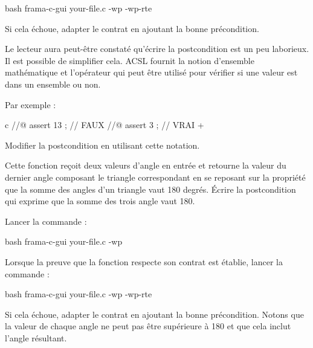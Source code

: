 \begin{CodeBlock}{bash}
frama-c-gui your-file.c -wp -wp-rte
\end{CodeBlock}


Si cela échoue, adapter le contrat en ajoutant la bonne précondition.


Le lecteur aura peut-être constaté qu'écrire la postcondition est un peu
laborieux. Il est possible de simplifier cela. ACSL fournit la notion
d'ensemble mathématique et l'opérateur  qui
peut être utilisé pour vérifier si une valeur est dans un ensemble ou non.


Par exemple :

\begin{CodeBlock}{c}
//@ assert 13  ; // FAUX
//@ assert 3   ; // VRAI
+\end{CodeBlock}


Modifier la postcondition en utilisant cette notation.




Cette fonction reçoit deux valeurs d'angle en entrée et retourne
la valeur du dernier angle composant le triangle correspondant en se
reposant sur la propriété que la somme des angles d'un triangle vaut
180 degrés. Écrire la postcondition qui exprime que la somme des trois
angle vaut 180.




Lancer la commande :


\begin{CodeBlock}{bash}
frama-c-gui your-file.c -wp
\end{CodeBlock}


Lorsque la preuve que la fonction respecte son contrat est établie, lancer
la commande :

\begin{CodeBlock}{bash}
frama-c-gui your-file.c -wp -wp-rte
\end{CodeBlock}


Si cela échoue, adapter le contrat en ajoutant la bonne précondition.
Notons que la valeur de chaque angle ne peut pas être supérieure à 180
et que cela inclut l'angle résultant.
